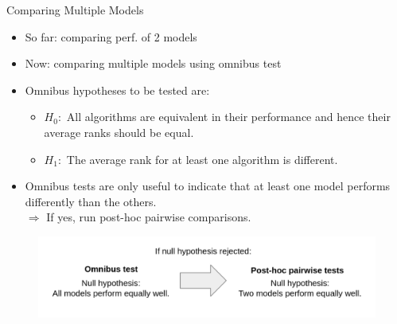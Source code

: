 \documentclass[11pt,compress,t,notes=noshow, xcolor=table]{beamer}
\begin{document}
\begin{frame}{Comparing Multiple Models}

\begin{itemize}
    \setlength\itemsep{1em}
    \item So far: comparing perf. of 2 models
    \item Now: comparing multiple models using omnibus test
    \item Omnibus hypotheses to be tested are:
        \begin{itemize}
            \item $H_0:$ All algorithms are equivalent in their performance and hence their average ranks should be equal.
            \item $H_1:$ The average rank for at least one algorithm is different.
        \end{itemize}
    \item Omnibus tests are only useful to indicate that at least one model performs differently than the others.\\
    $\Rightarrow$ If yes, run post-hoc pairwise comparisons.
\end{itemize}

\begin{figure}
    \centering
    \includegraphics{figure/omnibustesting.png}
\end{figure}

\end{frame}

\end{document}

